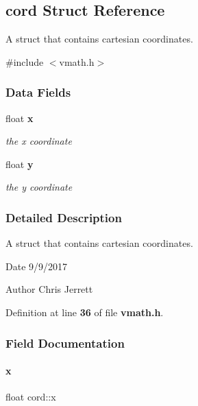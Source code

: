 \subsection{cord Struct Reference}
\label{structcord}


A struct that contains cartesian coordinates.  




{\ttfamily \#include $<$vmath.\+h$>$}

\subsubsection*{Data Fields}
\begin{DoxyCompactItemize}
\item 
float \textbf{ x}
\begin{DoxyCompactList}\small\item\em the x coordinate \end{DoxyCompactList}\item 
float \textbf{ y}
\begin{DoxyCompactList}\small\item\em the y coordinate \end{DoxyCompactList}\end{DoxyCompactItemize}


\subsubsection{Detailed Description}
A struct that contains cartesian coordinates. 

\begin{DoxyDate}{Date}
9/9/2017 
\end{DoxyDate}
\begin{DoxyAuthor}{Author}
Chris Jerrett 
\end{DoxyAuthor}


Definition at line \textbf{ 36} of file \textbf{ vmath.\+h}.



\subsubsection{Field Documentation}
\mbox{\label{structcord_a2eef9b681474b679cf87b0c20eced2cd}} 
\paragraph{x}
{\footnotesize\ttfamily float cord\+::x}



